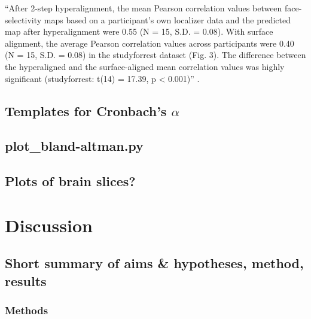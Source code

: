%
``After 2-step hyperalignment, the mean Pearson correlation values between
face-selectivity maps based on a participant's own localizer data and the
predicted map after hyperalignment were 0.55 (N = 15, S.D. = 0.08).
%
With surface alignment, the average Pearson correlation values across
participants were 0.40 (N = 15, S.D. = 0.08) in the studyforrest dataset (Fig.
3).
%
The difference between the hyperaligned and the surface-aligned mean correlation
values was highly significant (studyforrest: t(14) = 17.39, p < 0.001)''
\citep{jiahui2020predicting}.



\subsection{Templates for Cronbach's $\alpha$}







\subsection{plot\_bland-altman.py}



\subsection{Plots of brain slices?}






\section{Discussion}

\subsection{Short summary of aims \& hypotheses, method, results}



\subsubsection{Methods}

